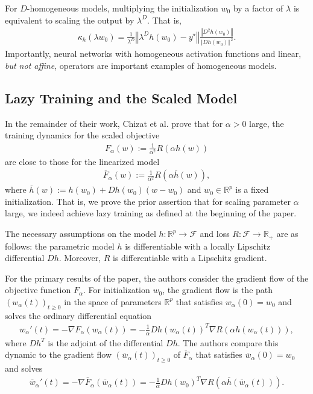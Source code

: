 \documentclass{article}
\begin{document}
For $D$-homogeneous models, multiplying the initialization $w_0$ by a factor of $\lambda$ is equivalent to scaling the output by $\lambda^D$. That is, 
\begin{align*}
    \kappa_{h}(\lambda w_0) = \frac{1}{\lambda^D} \left\Vert \lambda^D h(w_0) - y^{\star} \right\Vert \frac{\left\Vert D^2 h(w_0) \right\Vert}{\left\Vert Dh(w_0) \right\Vert^2}.
\end{align*}
Importantly, neural networks with homogeneous activation functions and linear, \textit{but not affine}, operators are important examples of homogeneous models.

\subsection{Lazy Training and the Scaled Model}
In the remainder of their work, Chizat et al. prove that for $\alpha > 0$ large, the training dynamics for the scaled objective
\begin{align*}
    F_{\alpha}(w) := \frac{1}{\alpha^2} R(\alpha h(w))
\end{align*}
are close to those for the linearized model
\begin{align*}
    \overline{F}_{\alpha}(w) := \frac{1}{\alpha^2} R(\alpha \overline{h}(w)),
\end{align*}
where $\overline{h}(w) := h(w_0) + Dh(w_0)(w - w_0)$ and $w_0 \in \mathbb{R}^p$ is a fixed initialization. That is, we prove the prior assertion that for scaling parameter $\alpha$ large, we indeed achieve lazy training as defined at the beginning of the paper. 

The necessary assumptions on the model $h: \mathbb{R}^p \rightarrow \mathcal{F}$ and loss $R: \mathcal{F} \rightarrow \mathbb{R}_+$ are as follows: the parametric model $h$ is differentiable with a locally Lipschitz differential $Dh$. Moreover, $R$ is differentiable with a Lipschitz gradient.

For the primary results of the paper, the authors consider the gradient flow of the objective function $F_{\alpha}$. For initialization $w_0$, the gradient flow is the path $(w_{\alpha}(t))_{t \geq 0}$ in the space of parameters $\mathbb{R}^p$ that satisfies $w_{\alpha}(0) = w_0$ and solves the ordinary differential equation
\begin{align*}
    w_{\alpha}'(t) = - \nabla F_{\alpha}(w_{\alpha}(t)) = - \frac{1}{\alpha} Dh(w_{\alpha}(t))^T \nabla R(\alpha h(w_{\alpha}(t))),
\end{align*}
where $Dh^T$ is the adjoint of the differential $Dh$. The authors compare this dynamic to the gradient flow $(\overline{w}_{\alpha}(t))_{t \geq 0}$ of $\overline{F}_{\alpha}$ that satisfies $\overline{w}_{\alpha}(0) = w_0$ and solves 
\begin{align*}
    \overline{w}_{\alpha}'(t) = - \nabla \overline{F}_{\alpha}(\overline{w}_{\alpha}(t)) = - \frac{1}{\alpha} Dh(w_0)^T \nabla R(\alpha \overline{h}(\overline{w}_{\alpha}(t))).
\end{align*}
\end{document}
